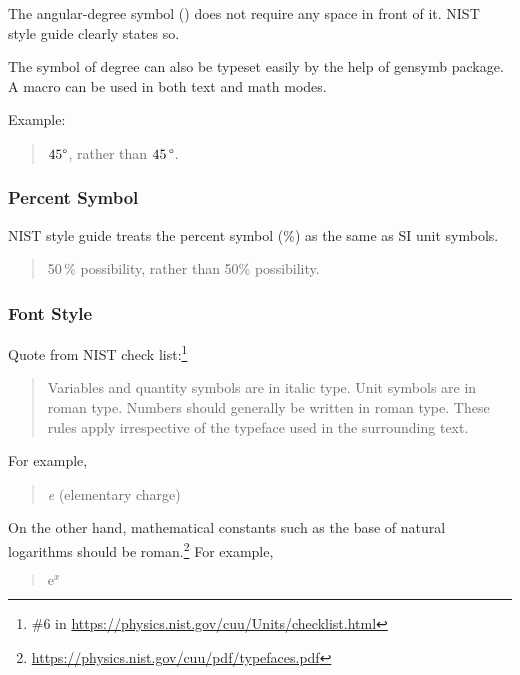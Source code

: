 The angular-degree symbol (\degree) does not require any space in front
of it. NIST style guide clearly states so.

The symbol of degree can also be typeset easily by the help of gensymb
package.
A macro \qco{\\degree} can be used in both text and math modes.

Example:

\begin{quote}
  $45\degree$, rather than $45\,\degree$.
\end{quote}

\subsubsection{Percent Symbol}
\label{sec:app:styleguide:Percent Symbol}

NIST style guide treats the percent symbol (\%) as the same as SI unit
symbols.

\begin{quote}
  50\,\% possibility, rather than 50\% possibility.
\end{quote}

\subsubsection{Font Style}
\label{sec:app:styleguide:Font Style}

Quote from NIST check list:\footnote{
  \#6 in \url{https://physics.nist.gov/cuu/Units/checklist.html}
}

\begin{quote}
  Variables and quantity symbols are in italic type. Unit symbols
  are in roman type. Numbers should generally be written in roman
  type. These rules apply irrespective of the typeface used in
  the surrounding text.
\end{quote}

For example,
\begin{quote}
  {\textit e} (elementary charge)
\end{quote}

On the other hand, mathematical constants such as the base
of natural logarithms should be roman.\footnote{
  \url{https://physics.nist.gov/cuu/pdf/typefaces.pdf}
}
For example,

\begin{quote}
  $\mathrm{e}^x$
\end{quote}


